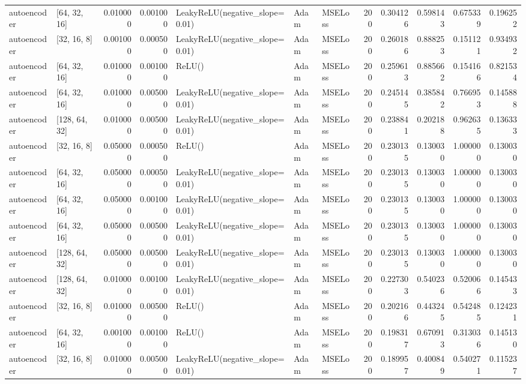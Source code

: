 \documentclass[10pt,twocolumn,letterpaper]{article}
\begin{document}
\begin{appendices}
{\begin{center}
\begin{tabular}{llrrlllrrrrr}
      autoencoder & [64, 32, 16] & 0.010000 & 0.001000 & LeakyReLU(negative\_slope=0.01) & Adam & MSELoss & 200 & 0.304126 & 0.598143 & 0.675339 & 0.196252 \\
      autoencoder & [32, 16, 8] & 0.001000 & 0.000500 & LeakyReLU(negative\_slope=0.01) & Adam & MSELoss & 200 & 0.260186 & 0.888253 & 0.151121 & 0.934932 \\
      autoencoder & [64, 32, 16] & 0.010000 & 0.001000 & ReLU() & Adam & MSELoss & 200 & 0.259613 & 0.885662 & 0.154166 & 0.821534 \\
      autoencoder & [64, 32, 16] & 0.010000 & 0.005000 & LeakyReLU(negative\_slope=0.01) & Adam & MSELoss & 200 & 0.245145 & 0.385842 & 0.766953 & 0.145888 \\
      autoencoder & [128, 64, 32] & 0.010000 & 0.005000 & LeakyReLU(negative\_slope=0.01) & Adam & MSELoss & 200 & 0.238841 & 0.202188 & 0.962635 & 0.136333 \\
      autoencoder & [32, 16, 8] & 0.050000 & 0.000500 & ReLU() & Adam & MSELoss & 200 & 0.230135 & 0.130030 & 1.000000 & 0.130030 \\
      autoencoder & [64, 32, 16] & 0.050000 & 0.000500 & LeakyReLU(negative\_slope=0.01) & Adam & MSELoss & 200 & 0.230135 & 0.130030 & 1.000000 & 0.130030 \\
      autoencoder & [64, 32, 16] & 0.050000 & 0.001000 & LeakyReLU(negative\_slope=0.01) & Adam & MSELoss & 200 & 0.230135 & 0.130030 & 1.000000 & 0.130030 \\
      autoencoder & [64, 32, 16] & 0.050000 & 0.005000 & LeakyReLU(negative\_slope=0.01) & Adam & MSELoss & 200 & 0.230135 & 0.130030 & 1.000000 & 0.130030 \\
      autoencoder & [128, 64, 32] & 0.050000 & 0.005000 & LeakyReLU(negative\_slope=0.01) & Adam & MSELoss & 200 & 0.230135 & 0.130030 & 1.000000 & 0.130030 \\
      autoencoder & [128, 64, 32] & 0.010000 & 0.001000 & LeakyReLU(negative\_slope=0.01) & Adam & MSELoss & 200 & 0.227303 & 0.540236 & 0.520066 & 0.145433 \\
      autoencoder & [32, 16, 8] & 0.010000 & 0.005000 & ReLU() & Adam & MSELoss & 200 & 0.202166 & 0.443245 & 0.542485 & 0.124231 \\
      autoencoder & [64, 32, 16] & 0.001000 & 0.001000 & ReLU() & Adam & MSELoss & 200 & 0.198317 & 0.670913 & 0.313036 & 0.145130 \\
      autoencoder & [32, 16, 8] & 0.010000 & 0.005000 & LeakyReLU(negative\_slope=0.01) & Adam & MSELoss & 200 & 0.189957 & 0.400849 & 0.540271 & 0.115237 \\

\end{tabular}
\end{center}}
\end{appendices}
\end{document}
